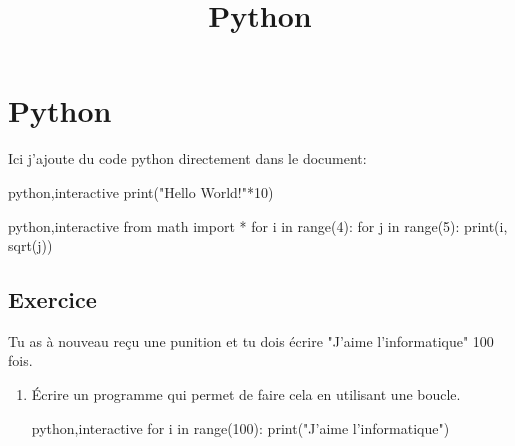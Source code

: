 \documentclass[a4paper,11pt]{article}
\begin{document}
\title{Python}
\date{}
\maketitle


\section{Python}
Ici j'ajoute du code python directement dans le document:\par

\begin{code}{python,interactive}
print("Hello World!"*10)
\end{code}


\begin{code}{python,interactive}
from math import *
for i in range(4):
    for j in range(5):
        print(i, sqrt(j))
\end{code}


\subsection{Exercice}
Tu as à nouveau reçu une punition et tu dois écrire "J'aime l'informatique" 100 fois.
\begin{enumerate}
\item Écrire un programme qui permet de faire cela en utilisant une boucle.
\begin{code}{python,interactive}
for i in range(100):
    print("J'aime l'informatique")
\end{code}
\end{enumerate}




\end{document}
